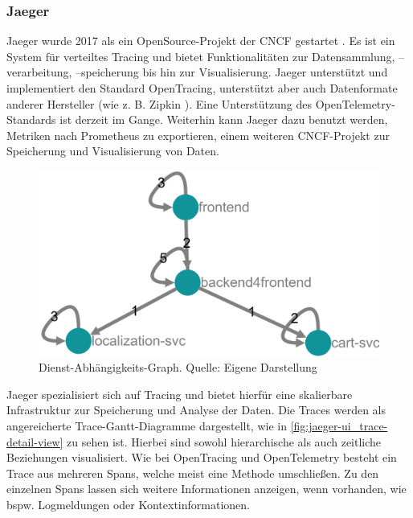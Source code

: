 \subsubsection{Jaeger}
\label{subsec:jaeger}

Jaeger wurde 2017 als ein OpenSource-Projekt der CNCF gestartet \cite{Jaeger}. Es ist ein System für verteiltes Tracing und bietet Funktionalitäten zur Datensammlung, --verarbeitung, --speicherung bis hin zur Visualisierung. Jaeger unterstützt und implementiert den Standard OpenTracing, unterstützt aber auch Datenformate anderer Hersteller (wie z. B. Zipkin \cite{Zipkin}). Eine Unterstützung des OpenTelemetry-Standards ist derzeit im Gange. Weiterhin kann Jaeger dazu benutzt werden, Metriken nach Prometheus \cite{Prometheus} zu exportieren, einem weiteren CNCF-Projekt zur Speicherung und Visualisierung von Daten.

\begin{figure}
\centering
\includegraphics[width=\linewidth]{img/03_methoden/jaeger_dependency-graph.png}
\caption{Dienst-Abhängigkeits-Graph. Quelle: Eigene Darstellung}
\label{fig:jaeger-ui_dependency-graph}
\end{figure}

Jaeger spezialisiert sich auf Tracing und bietet hierfür eine skalierbare Infrastruktur zur Speicherung und Analyse der Daten. Die Traces werden als angereicherte Trace-Gantt-Diagramme dargestellt, wie in \autoref{fig:jaeger-ui_trace-detail-view} zu sehen ist. Hierbei sind sowohl hierarchische als auch zeitliche Beziehungen visualisiert. Wie bei OpenTracing und OpenTelemetry besteht ein Trace aus mehreren Spans, welche meist eine Methode umschließen. Zu den einzelnen Spans lassen sich weitere Informationen anzeigen, wenn vorhanden, wie bspw. Logmeldungen oder Kontextinformationen.

